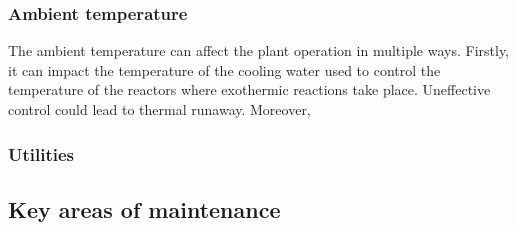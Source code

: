 \subsubsection{Ambient temperature}

The ambient temperature can affect the plant operation in multiple ways. Firstly, it can impact the temperature of the cooling water used to control the temperature of the reactors where exothermic reactions take place. Uneffective control could lead to thermal runaway. Moreover,  

\subsubsection{Utilities}


\subsection{Key areas of maintenance} %